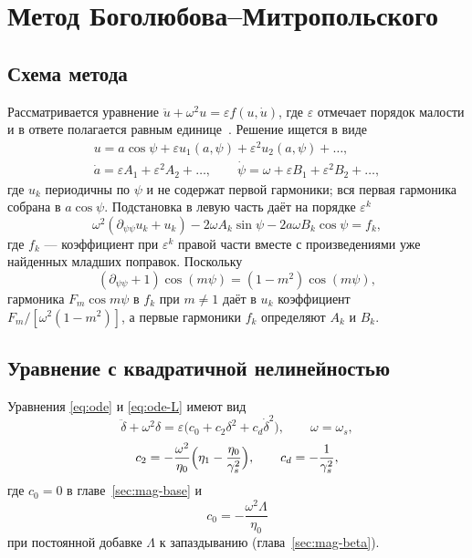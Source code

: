 \section{Метод Боголюбова--Митропольского}
\label{app:bm}

\subsection{Схема метода}

Рассматривается уравнение $\ddot u+\omega^2u=\varepsilon f(u,\dot u)$, где $\varepsilon$ отмечает порядок малости и в ответе полагается равным единице~\cite{Bogoliubov1961}. Решение ищется в виде
\begin{equation}
\label{eq:ansatz}
\begin{gathered}
u=a\cos\psi+\varepsilon u_1(a,\psi)+\varepsilon^2 u_2(a,\psi)+\dots,
\\
\dot a=\varepsilon A_1+\varepsilon^2 A_2+\dots,
\qquad
\dot\psi=\omega+\varepsilon B_1+\varepsilon^2 B_2+\dots,
\end{gathered}
\end{equation}
где $u_k$ периодичны по $\psi$ и не содержат первой гармоники; вся первая гармоника собрана в $a\cos\psi$. Подстановка в левую часть даёт на порядке $\varepsilon^k$
\begin{equation}
\label{eq:ordk}
\omega^2(\partial_{\psi\psi}u_k+u_k)-2\omega A_k\sin\psi-2a\omega B_k\cos\psi=f_k,
\end{equation}
где $f_k$ --- коэффициент при $\varepsilon^k$ правой части вместе с произведениями уже найденных младших поправок. Поскольку
\begin{equation}
\label{eq:harm-rule}
(\partial_{\psi\psi}+1)\cos(m\psi)=(1-m^2)\cos(m\psi),
\end{equation}
гармоника $F_m\cos m\psi$ в $f_k$ при $m\neq1$ даёт в $u_k$ коэффициент $F_m/[\omega^2(1-m^2)]$, а первые гармоники $f_k$ определяют $A_k$ и $B_k$.

\subsection{Уравнение с квадратичной нелинейностью}
\label{sec:bm-quad}

Уравнения \eqref{eq:ode} и \eqref{eq:ode-L} имеют вид
\begin{equation}
\label{eq:bm}
\ddot\delta+\omega^2\delta
=\varepsilon\bigl(c_0+c_2\delta^2+c_d\dot\delta^2\bigr),
\qquad
\omega=\omega_s,
\end{equation}
\begin{equation}
\label{eq:bm-coeff}
c_2=-\frac{\omega^2}{\eta_0}\Bigl(\eta_1-\frac{\eta_0}{\gamma_s^2}\Bigr),
\qquad
c_d=-\frac{1}{\gamma_s^2},
\end{equation}
где $c_0=0$ в главе~\ref{sec:mag-base} и
\begin{equation}
\label{eq:c0-L}
c_0=-\frac{\omega^2\Lambda}{\eta_0}
\end{equation}
при постоянной добавке $\Lambda$ к запаздыванию (глава~\ref{sec:mag-beta}).

